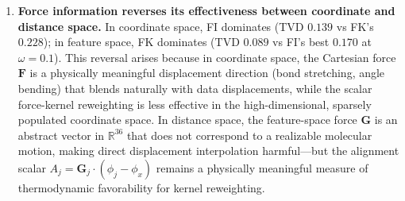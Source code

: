\documentclass[11pt]{article}
\newcommand{\bF}{\mathbf{F}}
\newcommand{\bG}{\mathbf{G}}
\newcommand{\R}{\mathbb{R}}
\begin{document}
\begin{enumerate}
    \item \textbf{Force information reverses its effectiveness between coordinate and distance space.}
    In coordinate space, FI dominates (TVD $0.139$ vs FK's $0.228$); in feature space, FK dominates (TVD $0.089$ vs FI's best $0.170$ at $\omega=0.1$).
    This reversal arises because in coordinate space, the Cartesian force $\bF$ is a physically meaningful displacement direction (bond stretching, angle bending) that blends naturally with data displacements, while the scalar force-kernel reweighting is less effective in the high-dimensional, sparsely populated coordinate space.
    In distance space, the feature-space force $\bG$ is an abstract vector in $\R^{36}$ that does not correspond to a realizable molecular motion, making direct displacement interpolation harmful---but the alignment scalar $A_j = \bG_j \cdot (\phi_j - \phi_x)$ remains a physically meaningful measure of thermodynamic favorability for kernel reweighting.
\end{enumerate}
\end{document}
